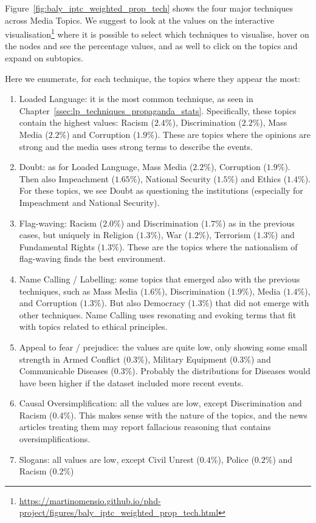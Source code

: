 Figure~\ref{fig:baly_iptc_weighted_prop_tech} shows the four major techniques across Media Topics. We suggest to look at the values on the interactive visualisation\footnote{\url{https://martinomensio.github.io/phd-project/figures/baly_iptc_weighted_prop_tech.html}} where it is possible to select which techniques to visualise, hover on the nodes and see the percentage values, and as well to click on the topics and expand on subtopics.

Here we enumerate, for each technique, the topics where they appear the most:

\begin{enumerate}
    \item Loaded Language: it is the most common technique, as seen in Chapter~\ref{ssec:lp_techniques_propaganda_stats}. Specifically, these topics contain the highest values: Racism ($2.4\%$), Discrimination ($2.2\%$), Mass Media ($2.2\%$) and Corruption ($1.9\%$). These are topics where the opinions are strong and the media uses strong terms to describe the events.
    \item Doubt: as for Loaded Language, Mass Media ($2.2\%$), Corruption ($1.9\%$). Then also Impeachment ($1.65\%$), National Security ($1.5\%$) and Ethics ($1.4\%$). For these topics, we see Doubt as questioning the institutions (especially for Impeachment and National Security).
    \item Flag-waving: Racism ($2.0\%$) and Discrimination ($1.7\%$) as in the previous cases, but uniquely in Religion ($1.3\%$), War ($1.2\%$), Terrorism ($1.3\%$) and Fundamental Rights ($1.3\%$). These are the topics where the nationalism of flag-waving finds the best environment.
    \item Name Calling / Labelling: some topics that emerged also with the previous techniques, such as Mass Media ($1.6\%$), Discrimination ($1.9\%$), Media ($1.4\%$), and Corruption ($1.3\%$). But also Democracy ($1.3\%$) that did not emerge with other techniques. Name Calling uses resonating and evoking terms that fit with topics related to ethical principles.
    \item Appeal to fear / prejudice: the values are quite low, only showing some small strength in Armed Conflict ($0.3\%$), Military Equipment ($0.3\%$) and Communicable Diseases ($0.3\%$). Probably the distributions for Diseases would have been higher if the dataset included more recent events.
    \item Causal Oversimplification: all the values are low, except Discrimination and Racism ($0.4\%$). This makes sense with the nature of the topics, and the news articles treating them may report fallacious reasoning that contains oversimplifications.
    \item Slogans: all values are low, except Civil Unrest ($0.4\%$), Police ($0.2\%$) and Racism ($0.2\%$)
\end{enumerate}


